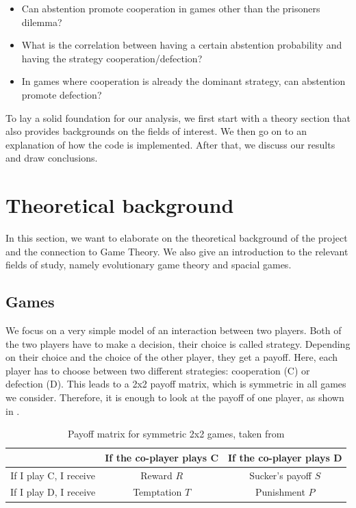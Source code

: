 \documentclass[12pt,oneside,a4paper,fleqn]{article}
\begin{document}
\begin{itemize}
    \item Can abstention promote cooperation in games other than the prisoners dilemma?
    \item What is the correlation between having a certain abstention probability and having the strategy cooperation/defection?
    \item In games where cooperation is already the dominant strategy, can abstention promote defection?
\end{itemize}

To lay a solid foundation for our analysis, we first start with a theory section that also provides backgrounds on the fields of interest. We then go on to an explanation of how the code is implemented. After that, we discuss our results and draw conclusions.

\section{Theoretical background}
In this section, we want to elaborate on the theoretical background of the project and the connection to Game Theory. We also give an introduction to the relevant fields of study, namely evolutionary game theory and spacial games.

\subsection{Games}
We focus on a very simple model of an interaction between two players. Both of the two players have to make a decision, their choice is called strategy. Depending on their choice and the choice of the other player, they get a payoff. Here, each player has to choose between two different strategies: cooperation (C) or defection (D). This leads to a 2x2 payoff matrix, which is symmetric in all games we consider. Therefore, it is enough to look at the payoff of one player, as shown in .

\begin{table}[H]
    \centering
    \begin{tabular}{c|c|c}
                               & If the co-player plays C & If the co-player plays D \\
        \hline
        If I play C, I receive & Reward $R$               & Sucker’s payoff $S$      \\
        \hline
        If I play D, I receive & Temptation $T$           & Punishment $P$           \\
    \end{tabular}
    \caption{Payoff matrix for symmetric 2x2 games, taken from \cite{nowak_sigmund_2000}}
    \label{tab:payoff_matrix}
\end{table}
\end{document}
